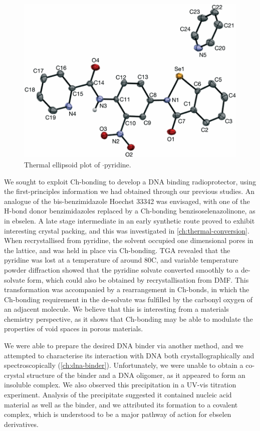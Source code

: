 \begin{refsection}
\begin{figure}
    \centering
    \includegraphics[width=0.8\linewidth]{Figures/ebs-nitroamide-2py-py-xtal.pdf}
    \caption{Thermal ellipsoid plot of $\cdot$pyridine.}
\end{figure}

We sought to exploit Ch-bonding to develop a DNA binding radioprotector, using the first-principles information we had obtained through our previous studies.
An analogue of the bis-benzimidazole Hoechst 33342 was envisaged, with one of the H-bond donor benzimidazoles replaced by a Ch-bonding benzisoselenazolinone, as in ebselen.
A late stage intermediate in an early synthetic route proved to exhibit interesting crystal packing, and this was investigated in \cref{ch:thermal-conversion}.
When recrystallised from pyridine, the solvent occupied one dimensional pores in the lattice, and was held in place via Ch-bonding.
TGA revealed that the pyridine was lost at a temperature of around 80\degree{}C, and variable temperature powder diffraction showed that the pyridine solvate converted smoothly to a de-solvate form, which could also be obtained by recrystallisation from DMF.\@
This transformation was accompanied by a rearrangement in Ch-bonds, in which the Ch-bonding requirement in the de-solvate was fulfilled by the carbonyl oxygen of an adjacent molecule.
We believe that this is interesting from a materials chemistry perspective, as it shows that Ch-bonding may be able to modulate the properties of void spaces in porous materials.

We were able to prepare the desired DNA binder via another method, and we attempted to characterise its interaction with DNA both crystallographically and spectroscopically (\cref{ch:dna-binder}).
Unfortunately, we were unable to obtain a co-crystal structure of the binder and a DNA oligomer, as it appeared to form an insoluble complex.
We also observed this precipitation in a UV-vis titration experiment.
Analysis of the precipitate suggested it contained nucleic acid material as well as the binder, and we attributed its formation to a covalent complex, which is understood to be a major pathway of action for ebselen derivatives.


\end{refsection}
